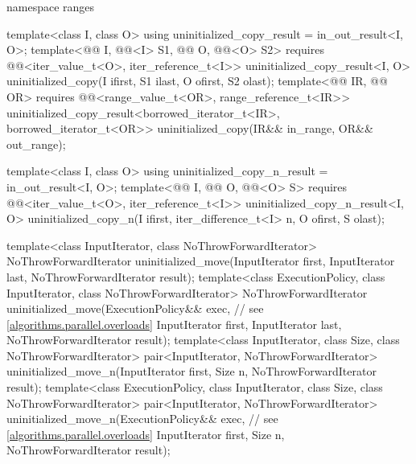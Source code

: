 \begin{codeblock}
{  namespace ranges {
    template<class I, class O>
      using uninitialized_copy_result = in_out_result<I, O>;
    template<@@ I, @@<I> S1,
             @@ O, @@<O> S2>
      requires @@<iter_value_t<O>, iter_reference_t<I>>
        uninitialized_copy_result<I, O>
          uninitialized_copy(I ifirst, S1 ilast, O ofirst, S2 olast);
    template<@@ IR, @@ OR>
      requires @@<range_value_t<OR>, range_reference_t<IR>>
        uninitialized_copy_result<borrowed_iterator_t<IR>, borrowed_iterator_t<OR>>
          uninitialized_copy(IR&& in_range, OR&& out_range);

    template<class I, class O>
      using uninitialized_copy_n_result = in_out_result<I, O>;
    template<@@ I, @@ O, @@<O> S>
      requires @@<iter_value_t<O>, iter_reference_t<I>>
        uninitialized_copy_n_result<I, O>
          uninitialized_copy_n(I ifirst, iter_difference_t<I> n, O ofirst, S olast);
  }

  template<class InputIterator, class NoThrowForwardIterator>
    NoThrowForwardIterator uninitialized_move(InputIterator first, InputIterator last,
                                              NoThrowForwardIterator result);
  template<class ExecutionPolicy, class InputIterator, class NoThrowForwardIterator>
    NoThrowForwardIterator uninitialized_move(ExecutionPolicy&& exec,   // see \ref{algorithms.parallel.overloads}
                                              InputIterator first, InputIterator last,
                                              NoThrowForwardIterator result);
  template<class InputIterator, class Size, class NoThrowForwardIterator>
    pair<InputIterator, NoThrowForwardIterator>
      uninitialized_move_n(InputIterator first, Size n, NoThrowForwardIterator result);
  template<class ExecutionPolicy, class InputIterator, class Size, class NoThrowForwardIterator>
    pair<InputIterator, NoThrowForwardIterator>
      uninitialized_move_n(ExecutionPolicy&& exec,              // see \ref{algorithms.parallel.overloads}
                           InputIterator first, Size n, NoThrowForwardIterator result);

}
\end{codeblock}
